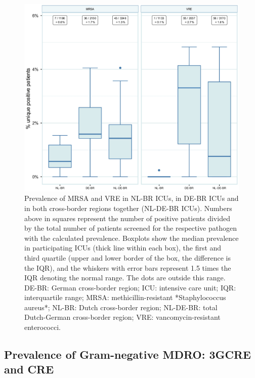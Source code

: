 \documentclass[
]{book}
\begin{document}
\begin{figure}

{\centering \includegraphics[width=1\linewidth]{images/10-01} 

}

\caption{Prevalence of MRSA and VRE in NL-BR ICUs, in DE-BR ICUs and in both cross-border regions together (NL-DE-BR ICUs). Numbers above in squares represent the number of positive patients divided by the total number of patients screened for the respective pathogen with the calculated prevalence. Boxplots show the median prevalence in participating ICUs (thick line within each box), the first and third quartile (upper and lower border of the box, the difference is the IQR), and the whiskers with error bars represent 1.5 times the IQR denoting the normal range. The dots are outside this range. DE-BR: German cross-border region; ICU: intensive care unit; IQR: interquartile range; MRSA: methicillin-resistant *Staphylococcus aureus*; NL-BR: Dutch cross-border region; NL-DE-BR: total Dutch-German cross-border region; VRE: vancomycin-resistant enterococci.}\label{fig:fig10-1}
\end{figure}

\hypertarget{prevalence-of-gram-negative-mdro-3gcre-and-cre}{%
\subsection{Prevalence of Gram-negative MDRO: 3GCRE and CRE}\label{prevalence-of-gram-negative-mdro-3gcre-and-cre}}
\end{document}
